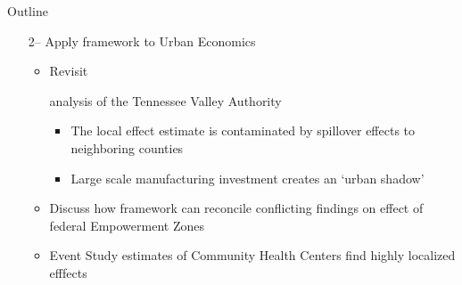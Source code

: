 \documentclass[aspectratio=169,t]{beamer}
\begin{document}
\begin{frame}{Outline}
    \begin{itemize}
        \item[2--] Apply framework to Urban Economics
        \begin{itemize}
            \item Revisit \begin{citecolor}\citet{Kline_Moretti_2014a}\end{citecolor} analysis of the Tennessee Valley Authority
            
            \begin{itemize}
                \vspace{2.5mm}
                \item The local effect estimate is contaminated by spillover effects to neighboring counties \begin{citecolor}\citep{Kline_Moretti_2014b}\end{citecolor}
                
                \vspace{2.5mm}
                \item Large scale manufacturing investment creates an `urban shadow' \begin{citecolor}\citep{Cuberes_Desmet_Rappaport_2021,Fujita_Krugman_Venables_2001}\end{citecolor}
            \end{itemize}
            
            \vspace{2.5mm}
            \item Discuss how framework can reconcile conflicting findings on effect of federal Empowerment Zones \begin{citecolor}\citep{Busso_Gregory_Kline_2013,Neumark_Kolko_2010}\end{citecolor}
            
            \vspace{2.5mm}
            \item Event Study estimates of Community Health Centers find highly localized efffects \begin{citecolor}\citep{Bailey_Goodman_Bacon_2015}\end{citecolor}
        \end{itemize}
    \end{itemize} 
\end{frame}
\end{document}

